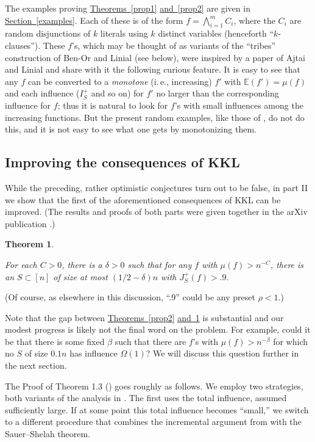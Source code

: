 \documentclass[11pt]{article}
\numberwithin{equation}{section}
\theoremstyle{definition}
\theoremstyle{plain}
\newcommand{\ie}{i.\,e.}
\newcommand{\expref}[2]{\hyperref[#2]{#1~\ref{#2}}}
\newtheorem{thm}{Theorem}[section]
\newcommand{\nin}[0]{\noindent}
\newcommand{\0}[0]{\emptyset}
\newcommand{\gb}[0]{\beta }
\newcommand{\gO}[0]{\Omega}
\begin{document}
The examples proving \expref{Theorems}{prop1} \expref{and}{prop2} 
are given in \expref{Section}{examples}.
Each of these is of the form %
$f= \bigwedge_{i=1}^m C_i$,  %
where the %
$C_i$  %
are random %
disjunctions %
of $k$ literals
using $k$ distinct variables (henceforth ``$k$-clauses'').
These $f$'s, %
%
which may be thought of as
variants of the ``tribes''
construction of Ben-Or and Linial
(see below),
were inspired by a paper of
Ajtai and Linial \cite {AL} and share with it the following
curious feature.
%
It is  %
easy to see that any $f$ can be converted to a
\emph{monotone}
(\ie, increasing) $f'$ with $\mathbb E (f')=\mu(f) $ and each
influence ($I_S^+$ and so on) for $f'$ no larger than
the corresponding influence for $f$;
thus %
it is  %
natural to look for $f$'s %
%
with small influences
among the increasing functions.
But the present random examples, like those of \cite{AL},
do not do this, and %
it is %
not easy to see what one gets by monotonizing them.

\subsection *{Improving the consequences of KKL}

While the preceding, rather optimistic conjectures turn out to be false, 
in part II  we show
that the first of the aforementioned consequences of KKL can be 
improved. (The results and proofs of both parts were given together in
the arXiv publication \cite {BKK21}.) 
%
%

\noindent
\begin{thm}\label{prop3}

For each $C>0$, there is a $\delta>0$ such that for any $f$ with 
$\mu(f) >n^{-C}$, there
is an $S\subset [n]$ of size at most $(1/2-\delta)n$ with $J_{S}^{+}(f)>.9.$
\end {thm}
\nin
(Of course, as elsewhere in this discussion, ``.9'' could be any preset $\rho <1$.)

Note that the gap between \expref{Theorems}{prop2} \expref{and}{prop3} is substantial 
and our modest progress is likely not the final word on the problem.
For example, could it be that there is some fixed $\gb$ such that there
are $f$'s with %
%
%
$\mu(f) > n^{-\gb}$ for which no $S$ of size $0.1 n$ has influence $\gO(1)$?
We will discuss this question further in the next section.


%
%
%
The Proof of Theorem 1.3 (\cite {BKK21}) goes roughly as follows.
We employ two strategies, both variants of the analysis in \cite{kkl}.
The first 
uses the total influence, assumed sufficiently large.
If at some point this total influence becomes ``small,'' 
we switch to a different procedure that
combines the incremental argument from \cite{kkl} with the 
Sauer--Shelah %
theorem.  %
\end{document}

